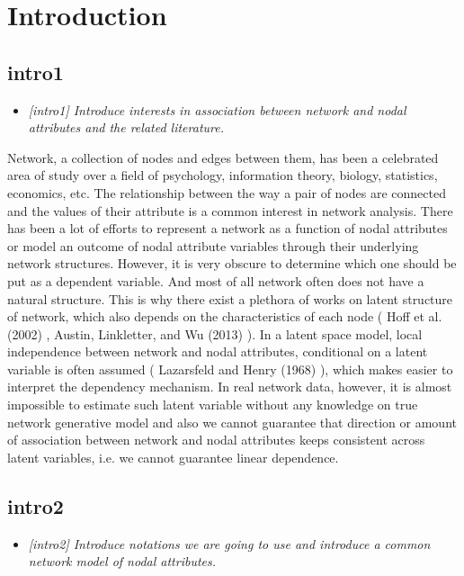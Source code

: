 \documentclass[12pt]{article}
\theoremstyle{definition}
\begin{document}
\newpage

\section{Introduction}

\subsection{intro1}
\begin{itemize}
\item {\it  [intro1] Introduce interests in association between network and nodal attributes and the related literature.   \/}
\end{itemize}

Network, a collection of nodes and edges between them, has been a celebrated area of study over a field of psychology, information theory, biology, statistics, economics, etc. The relationship between the way a pair of nodes are connected and the values of their attribute is a common interest in network analysis. There has been a lot of efforts to represent a network as a function of nodal attributes or model an outcome of nodal attribute variables through their underlying network structures. However, it is very obscure to determine which one should be put as a dependent variable. And most of all network often does not have a natural structure. This is why there exist a plethora of works on latent structure of network, which also depends on the characteristics of each node ( Hoff et al. (2002) , Austin, Linkletter, and Wu (2013) ). In a latent space model, local independence between network and nodal attributes, conditional on a latent variable is often assumed ( Lazarsfeld and Henry (1968) ), which makes easier to interpret the dependency mechanism. In real network data, however, it is almost impossible to estimate such latent variable without any knowledge on true network generative model and also we cannot guarantee that direction or amount of association between network and nodal attributes keeps consistent across latent variables, i.e. we cannot guarantee linear dependence. 


\subsection{intro2}
\begin{itemize}
	\item {\it  [intro2] Introduce notations we are going to use and introduce a common network model of nodal attributes.   \/}
\end{itemize}
\end{document}
